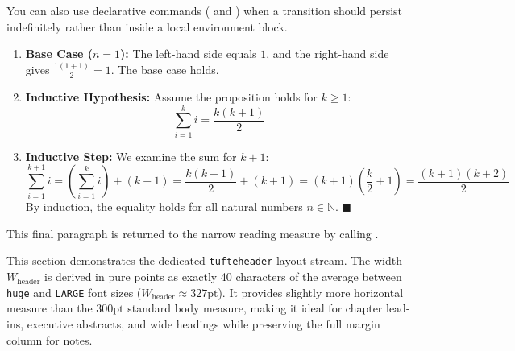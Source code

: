\documentclass[paper=a4, fontsize=9]{habshe-tufte}
\begin{document}
\lipsum[10]

\setlayoutfullwidth


You can also use declarative commands (\texttt{\string\setlayoutfullwidth} and \texttt{\string\setlayouttufte}) when a transition should persist indefinitely rather than inside a local environment block.

\begin{enumerate}
\item \textbf{Base Case ($n=1$):} The left-hand side equals $1$, and the right-hand side gives $\frac{1(1+1)}{2} = 1$. The base case holds.
\item \textbf{Inductive Hypothesis:} Assume the proposition holds for $k \ge 1$:
  $$
  \sum_{i=1}^k i = \frac{k(k+1)}{2}
  $$
\item \textbf{Inductive Step:} We examine the sum for $k+1$:
  $$
  \sum_{i=1}^{k+1} i = \left(\sum_{i=1}^k i\right) + (k+1) = \frac{k(k+1)}{2} + (k+1) = (k+1)\left(\frac{k}{2} + 1\right) = \frac{(k+1)(k+2)}{2}
  $$
  By induction, the equality holds for all natural numbers $n \in \mathbb{N}$. $\blacksquare$
\end{enumerate}

\setlayouttufte


This final paragraph is returned to the narrow reading measure by calling \texttt{\string\setlayouttufte}.

\lipsum[11]

\newpage

\subject{Part IV: Tufte-Header Stream}


This section demonstrates the dedicated \texttt{tufteheader} layout stream. 
The width $W_{\text{header}}$ is derived in pure points as exactly 40 characters of the average between \texttt{huge} and \texttt{LARGE} font sizes ($W_{\text{header}} \approx 327\text{pt}$).
It provides slightly more horizontal measure than the $300\text{pt}$ standard body measure, making it ideal for chapter lead-ins, executive abstracts, and wide headings while preserving the full margin column for notes.
\end{document}
